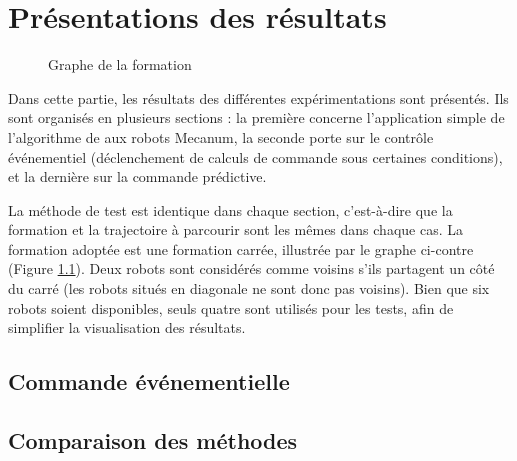 \chapter{Présentations des résultats}
\label{chap:resultats}
\begin{figure}
    \vspace{-0.2cm}
    \centering
    \caption{Graphe de la formation}
    \label{fig:formation}
    \vspace{-0.5cm}
\end{figure}

Dans cette partie, les résultats des différentes expérimentations sont présentés. Ils sont organisés en plusieurs sections : la première concerne l'application simple de l'algorithme de \cite{koung_consensus-based_2020} aux robots Mecanum, la seconde porte sur le contrôle événementiel (déclenchement de calculs de commande sous certaines conditions), et la dernière sur la commande prédictive.

La méthode de test est identique dans chaque section, c'est-à-dire que la formation et la trajectoire à parcourir sont les mêmes dans chaque cas.
La formation adoptée est une formation carrée, illustrée par le graphe ci-contre (Figure \ref{fig:formation}).
Deux robots sont considérés comme voisins s'ils partagent un côté du carré (les robots situés en diagonale ne sont donc pas voisins). 
Bien que six robots soient disponibles, seuls quatre sont utilisés pour les tests, afin de simplifier la visualisation des résultats.





\section{Commande événementielle}





\section{Comparaison des méthodes}




